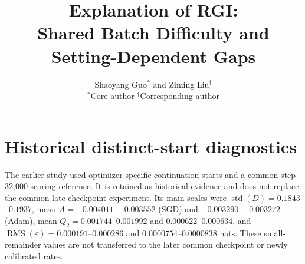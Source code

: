 \documentclass[11pt]{article}
\title{Explanation of RGI:\\Shared Batch Difficulty and Setting-Dependent Gaps}
\author{
  Shaoyang Guo$^{*}$ and Ziming Liu$^{\dagger}$\\
  \small $^*$Core author \quad $^\dagger$Corresponding author
}
\date{}
\newcommand{\RMS}{\operatorname{RMS}}
\begin{document}
\maketitle

\begin{metaabstract}

\end{metaabstract}












\appendix

\section{Historical distinct-start diagnostics}
The earlier study used optimizer-specific continuation starts and a common step-32,000 scoring reference.  It is retained as historical evidence and does not replace the common late-checkpoint experiment.  Its main scales were \(\operatorname{std}(D)=0.1843\)--\(0.1937\), mean \(A=-0.004011\)--\(-0.003552\) (SGD) and \(-0.003290\)--\(-0.003272\) (Adam), mean \(Q_2=0.001744\)--\(0.001992\) and \(0.000622\)--\(0.000634\), and \(\RMS(\varepsilon)=0.000191\)--\(0.000286\) and \(0.0000754\)--\(0.0000838\) nats.  These small-remainder values are not transferred to the later common checkpoint or newly calibrated rates.


\end{document}
